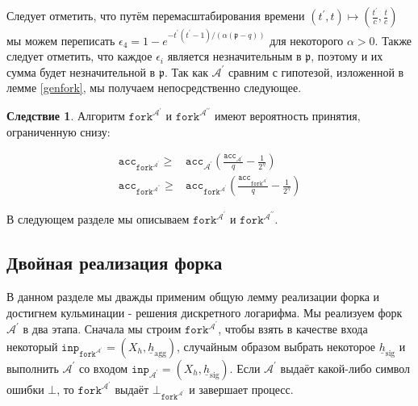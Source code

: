 \documentclass{mrl}
\theoremstyle{definition}
\numberwithin{theorem}{subsection}
\newtheorem{cor}[theorem]{Следствие}
\newcommand{\adversary}{\mathcal{A}}
\begin{document}
Следует отметить, что путём перемасштабирования времени $(t^\prime, t) \mapsto (\frac{t^\prime}{c}, \frac{t}{c})$ мы можем переписать $\epsilon_4 = 1 - e^{-t^\prime(t^\prime - 1)/(\alpha(\mathfrak{p} - q))}$ для некоторого $\alpha > 0$. Также следует отметить, что каждое $\epsilon_i$ является незначительным в $\mathfrak{p}$, поэтому и их сумма будет незначительной в $\mathfrak{p}$. Так как $\adversary^\prime$ сравним с гипотезой, изложенной в лемме \ref{genfork}, мы получаем непосредственно следующее.

\begin{cor}
Алгоритм $\texttt{fork}^{\adversary^\prime}$ и $\texttt{fork}^{\adversary^{\prime \prime}}$ имеют вероятность принятия, ограниченную снизу:

\begin{align*}
\texttt{acc}_{\texttt{fork}^{\adversary^\prime}} \geq& \texttt{acc}_{\adversary^\prime} \left(\frac{\texttt{acc}_{\adversary^\prime}}{q} - \frac{1}{2^\eta}\right) \\
\texttt{acc}_{\texttt{fork}^{\adversary^{\prime \prime}}} \geq& \texttt{acc}_{\texttt{fork}^{\adversary^\prime}} \left(\frac{\texttt{acc}_{\texttt{fork}^{\adversary^\prime}}}{q} - \frac{1}{2^\eta}\right)
\end{align*}
\end{cor}

В следующем разделе мы описываем $\texttt{fork}^{\adversary^\prime}$ и $\texttt{fork}^{\adversary^{\prime \prime}}$.


\subsection{Двойная реализация форка}\label{forkingTwice}

В данном разделе мы дважды применим общую лемму реализации форка и достигнем кульминации - решения дискретного логарифма. Мы реализуем форк $\adversary^\prime$ в два этапа. Сначала мы строим $\texttt{fork}^{\adversary^\prime}$, чтобы взять в качестве входа некоторый $\texttt{inp}_{\texttt{fork}^{\adversary^\prime}} = (X_h, \underline{h}_{\text{agg}})$, случайным образом выбрать некоторое $\underline{h}_{\text{sig}}$ и выполнить $\adversary^\prime$ со входом $\texttt{inp}_{\adversary^\prime} = (X_h, \underline{h}_{\text{sig}})$. Если $\adversary^\prime$ выдаёт какой-либо символ ошибки $\bot$, то $\texttt{fork}^{\adversary^\prime}$ выдаёт $\bot_{\texttt{fork}^{\adversary^\prime}}$ и завершает процесс.
\end{document}
